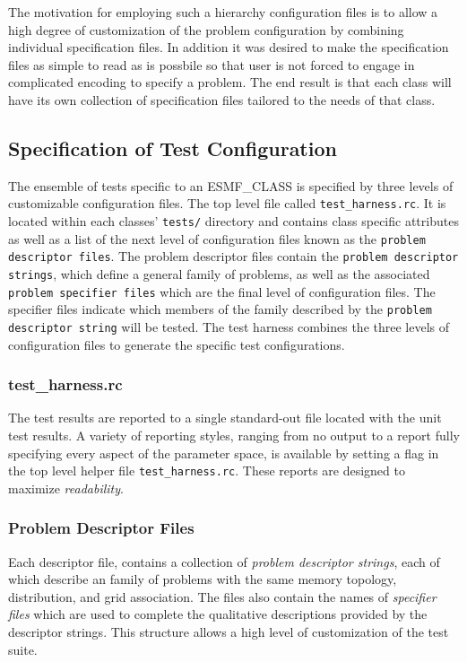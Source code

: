 The motivation for employing such a hierarchy configuration files is to allow a high degree of customization of the problem configuration by combining individual specification files. In addition it was desired to make the specification files as simple to read as is possbile so that user is not forced to engage in complicated encoding to specify a problem. The end result is that each class will have its own 
collection of specification files tailored to the needs of that class.

\subsection{Specification of Test Configuration}
The ensemble of tests specific to an {ESMF\_CLASS} is specified by three levels of customizable configuration files. The top level file called \texttt{test\_harness.rc}. It is located within each classes' \texttt{tests/} directory and contains class specific attributes as well as a list of the next level of configuration files known as the \texttt{problem descriptor files}. The problem descriptor files contain the \texttt{problem descriptor strings}, which define a general family of problems, as well as the associated \texttt{problem specifier files} which are the final level of configuration files. The specifier files indicate which members of the family described by the \texttt{problem descriptor string} will be tested. The test harness combines the three levels of configuration files to generate the specific test configurations. 
 
\subsubsection{test\_harness.rc}

The test results are reported to a single standard-out file located with the unit test results. A variety of reporting styles, ranging from no output to a report fully specifying every aspect of the parameter space, is available by setting a flag in the top level helper file \texttt{test\_harness.rc}. These reports are designed to maximize  \textit{readability}.

\subsubsection{Problem Descriptor Files}
Each descriptor file, contains a collection of \textit{problem descriptor strings}, each of which describe an family of problems with the same memory topology, distribution, and grid association. The files also contain the names of \textit{specifier files} which are used to complete the qualitative descriptions provided by the descriptor strings. This structure allows a high level of customization of the test suite.

